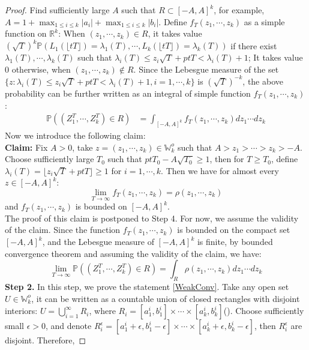 \begin{proof}
Find sufficiently large $A$ such that $R\subset[-A,A]^{k}$, for example, $A=1+\max_{1\leqslant i\leqslant k}|a_{i}|+\max_{1\leqslant i\leqslant k}|b_{i}|$. Define $f_{T}(z_{1},\cdots,z_{k})$ as a simple function on $\mathbb{R}^{k}$: When $(z_{1},\cdots,z_{k})\in R$, it takes value $(\sqrt{T})^{k}\mathbb{P}(L_{1}(\lfloor tT \rfloor)=\lambda_{1}(T),\cdots,L_{k}(\lfloor tT \rfloor)=\lambda_{k}(T)) $ if there exist $\lambda_{1}(T),\cdots,\lambda_{k}(T)$ such that $\lambda_{i}(T)\leqslant z_{i}\sqrt{T}+ptT<\lambda_{i}(T)+1$; It takes value $0$ otherwise, when $(z_{1},\cdots,z_{k})\notin R$.  Since the Lebesgue measure of the set $\{z:\lambda_{i}(T)\leqslant z_{i}\sqrt{T}+ptT<\lambda_{i}(T)+1,i=1,\cdots,k\}$ is $(\sqrt{T})^{-k}$, the above probability can be further written as an integral of simple function $f_{T}(z_{1},\cdots,z_{k})$:
\begin{align*}
\mathbb{P}((Z_{1}^{T},\cdots,Z_{k}^{T})\in R)&=\int_{[-A,A]^{k}}f_{T}(z_{1},\cdots,z_{k})dz_{1}\cdots dz_{k}
\end{align*}
Now we introduce the following claim:\\
\textbf{Claim: }Fix $A>0$, take $z=(z_{1},\cdots,z_{k})\in\mathbb{W}_{k}^{o}$ such that $A>z_{1}>\cdots>z_{k}>-A$. Choose sufficiently large $T_{0}$ such that $ptT_{0}-A\sqrt{T_{0}}\geqslant 1$, then for $T\geqslant T_{0}$, define $\lambda_{i}(T)=\lfloor z_{i}\sqrt{T}+ptT\rfloor\geqslant 1$ for $i=1,\cdots,k$. Then we have for almost every $z\in[-A,A]^{k}$:
$$\lim_{T\rightarrow\infty}f_{T}(z_{1},\cdots,z_{k})=\rho(z_{1},\cdots,z_{k})$$ and $f_{T}(z_{1},\cdots,z_{k})$ is bounded on $[-A,A]^{k}$.\\
The proof of this claim is postponed to Step 4. For now, we assume the validity of the claim. Since the function $f_{T}(z_{1},\cdots,z_{k})$ is bounded on the compact set $[-A,A]^{k}$, and the Lebesgue measure of $[-A,A]^{k}$ is finite, by bounded convergence theorem and assuming the validity of the claim, we have:
$$\lim_{T\rightarrow\infty}\mathbb{P}((Z_{1}^{T},\cdots,Z_{k}^{T})\in R)=\int_{R}\rho(z_{1},\cdots,z_{k})dz_{1}\cdots dz_{k}$$
\textbf{Step 2. }In this step, we prove the statement \ref{WeakConv}. Take any open set $U\in \mathbb{W}_{k}^{o}$, it can be written as a countable union of closed rectangles with disjoint interiors: $U=\bigcup_{i=1}^{\infty}R_{i}$, where $R_{i}=[a_{1}^{i},b_{1}^{i}]\times\cdots\times[a_{k}^{i},b_{k}^{i}]$(\cite[Theorem 1.4]{Stein}). Choose sufficiently small $\epsilon>0$, and denote $R_{i}^{\epsilon}=[a_{1}^{i}+\epsilon,b_{1}^{i}-\epsilon]\times\cdots\times[a_{k}^{i}+\epsilon,b_{k}^{i}-\epsilon]$, then $R_{i}^{\epsilon}$ are disjoint. Therefore,

\end{proof}
